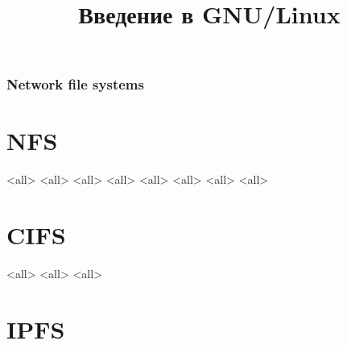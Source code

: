 

\title{Введение в GNU/Linux}




\begin{frame}
	\frametitle{Network file systems}
	\titlepage
	\vspace{-0.5cm}
	\begin{center}
	\end{center}
\end{frame}


\begin{frame}
	\tableofcontents
	[hideallsubsections]
\end{frame}


\section{NFS}
\mode<all>{}
\mode<all>{}
\mode<all>{}
\mode<all>{}
\mode<all>{}
\mode<all>{}
\mode<all>{}
\mode<all>{}
\section{CIFS}
\mode<all>{}
\mode<all>{}
\mode<all>{}
\section{IPFS}


